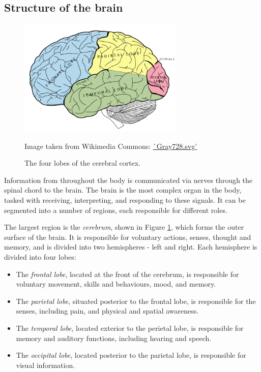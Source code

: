 
\subsection*{Structure of the brain}\label{svd-brain}

\begin{figure}[ht]
	\centering
	\includegraphics[width=0.7\textwidth]{Images/2_Lobes_of_the_brain_NL.png}
	\caption{The four lobes of the cerebral cortex.}
	\small Image taken from Wikimedia Commons: \url{`Gray728.svg'}
	\label{svd-cerebrumfig}
\end{figure}

Information from throughout the body is communicated via nerves through the spinal chord to the brain. The brain is the most complex organ in the body, tasked with receiving, interpreting, and responding to these signals. It can be segmented into a number of regions, each responsible for different roles.

The largest region is the \textit{cerebrum}, shown in Figure \ref{svd-cerebrumfig}, which forms the outer surface of the brain. It is responsible for voluntary actions, senses, thought and memory, and is divided into two hemispheres - left and right. Each hemisphere is divided into four lobes:
 \begin{itemize}
	\item The \textit{frontal lobe}, located at the front of the cerebrum, is responsible for voluntary movement, skills and behaviours, mood, and memory.
	\item The \textit{parietal lobe}, situated posterior to the frontal lobe, is responsible for the senses, including pain, and physical and spatial awareness.
	\item The \textit{temporal lobe}, located exterior to the perietal lobe, is responsible for memory and auditory functions, including hearing and speech.
	\item The \textit{occipital lobe}, located posterior to the parietal lobe, is responsible for visual information.
\end{itemize}

